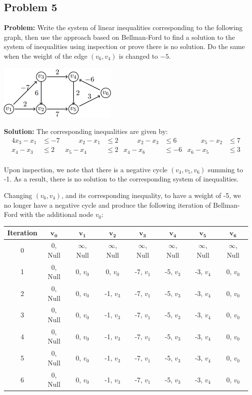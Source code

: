 \documentclass{article}
\begin{document}
\subsection*{Problem 5}
\noindent\textbf{Problem:} Write the system of linear inequalities corresponding to the following graph, then use the approach based on Bellman-Ford to find a solution to the system of inequalities using inspection or prove there is no solution. Do the same when the weight of the edge $(v_6, v_4)$ is changed to $-5$.
\begin{center}
  \includegraphics{inequalities.png}
\end{center}
\bigskip

\noindent\textbf{Solution:} The corresponding inequalities are given by:
\begin{alignat*}{4}
  x_3-x_1&\le-7  &\qquad  x_2-x_1&\le2  &\qquad  x_2-x_3&\le6 &\qquad x_5-x_2&\le7\\
  x_4-x_3&\le2  &  x_5-x_4&\le2 &  x_4-x_6&\le-6 & x_6-x_5&\le3\\
\end{alignat*}

Upon inspection, we note that there is a negative cycle $(v_4,v_5,v_6)$ summing to -1. As a result, there is no solution to the corresponding system of inequalities.

Changing $(v_6,v_4)$, and its corresponding inequality, to have a weight of -5, we no longer have a negative cycle and produce the following iteration of Bellman-Ford with the additional node $v_0$:
\begin{center}
  \begin{tabular}{c|c|c|c|c|c|c|c}
    \textbf{Iteration} & $\bm{v_0}$ & $\bm{v_1}$ & $\bm{v_2}$ & $\bm{v_3}$ & $\bm{v_4}$ & $\bm{v_5}$ & $\bm{v_6}$\\
    \hline
    0 & 0, Null & $\infty$, Null & $\infty$, Null & $\infty$, Null & $\infty$, Null & $\infty$, Null & $\infty$, Null\\
    \hline
    1 & 0, Null & 0, $v_0$ & 0, $v_0$ & -7, $v_1$ & -5, $v_3$ & -3, $v_4$ & 0, $v_0$\\
    \hline
    2 & 0, Null & 0, $v_0$ & -1, $v_3$ & -7, $v_1$ & -5, $v_3$ & -3, $v_4$ & 0, $v_0$\\
    \hline
    3 & 0, Null & 0, $v_0$ & -1, $v_3$ & -7, $v_1$ & -5, $v_3$ & -3, $v_4$ & 0, $v_0$\\
    \hline
    4 & 0, Null & 0, $v_0$ & -1, $v_3$ & -7, $v_1$ & -5, $v_3$ & -3, $v_4$ & 0, $v_0$\\
    \hline
    5 & 0, Null & 0, $v_0$ & -1, $v_3$ & -7, $v_1$ & -5, $v_3$ & -3, $v_4$ & 0, $v_0$\\
    \hline
    6 & 0, Null & 0, $v_0$ & -1, $v_3$ & -7, $v_1$ & -5, $v_3$ & -3, $v_4$ & 0, $v_0$
  \end{tabular}
\end{center}
\end{document}
